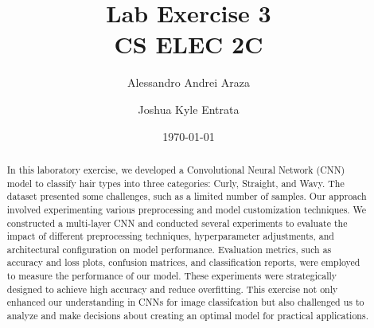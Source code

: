 

\title{{\Huge Lab Exercise 3}\\{\small CS ELEC 2C}}
\author{Alessandro Andrei Araza \and Joshua Kyle Entrata}
\date{\today}



    \maketitle

    \begin{abstract}
        In this laboratory exercise, we developed a Convolutional Neural Network (CNN) model to classify hair types into three categories: Curly, Straight, and Wavy. The dataset presented some challenges, such as a limited number of samples. Our approach involved experimenting various preprocessing and model customization techniques. We constructed a multi-layer CNN and conducted several experiments to evaluate the impact of different preprocessing techniques, hyperparameter adjustments, and architectural configuration on model performance. Evaluation metrics, such as accuracy and loss plots, confusion matrices, and classification reports, were employed to measure the performance of our model. These experiments were strategically designed to achieve high accuracy and reduce overfitting. This exercise not only enhanced our understanding in CNNs for image classifcation but also challenged us to analyze and make decisions about creating an optimal model for practical applications.
    \end{abstract}

    \begin{multicols}{2}
        \raggedcolumns
        
        
        
        
        
    \end{multicols}

    \newpage
    


